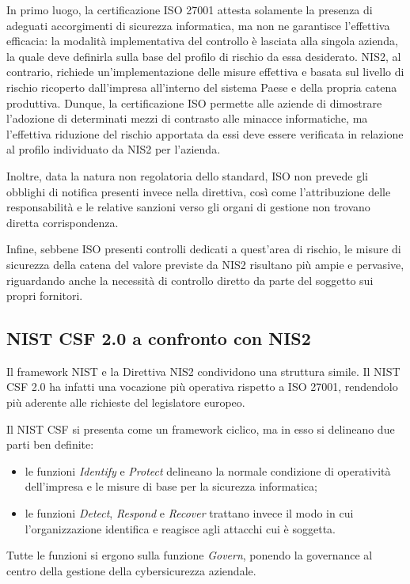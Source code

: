 In primo luogo, la certificazione ISO 27001 attesta solamente la presenza di adeguati accorgimenti di sicurezza informatica, ma non ne garantisce
l'effettiva efficacia: la modalità implementativa del controllo è lasciata alla singola azienda, la quale deve definirla sulla base del profilo di 
rischio da essa desiderato. NIS2, al contrario, richiede un'implementazione delle misure effettiva e basata sul livello di rischio ricoperto 
dall'impresa all'interno del sistema Paese e della propria catena produttiva. Dunque, la certificazione ISO permette alle aziende di dimostrare
l'adozione di determinati mezzi di contrasto alle minacce informatiche, ma l'effettiva riduzione del rischio apportata da essi deve essere 
verificata in relazione al profilo individuato da NIS2 per l'azienda.

Inoltre, data la natura non regolatoria dello standard, ISO non prevede gli obblighi di notifica presenti invece nella direttiva, così
come l'attribuzione delle responsabilità e le relative sanzioni verso gli organi di gestione non trovano diretta corrispondenza.

Infine, sebbene ISO presenti controlli dedicati a quest'area di rischio, le misure di sicurezza della catena del valore previste
da NIS2 risultano più ampie e pervasive, riguardando anche la necessità di controllo diretto da parte del soggetto sui propri fornitori.


\subsection{NIST CSF 2.0 a confronto con NIS2}
Il framework NIST e la Direttiva NIS2 condividono una struttura simile. Il NIST CSF 2.0 ha infatti una vocazione più operativa rispetto a 
ISO 27001, rendendolo più aderente alle richieste del legislatore europeo. 

Il NIST CSF si presenta come un framework ciclico, ma in esso si delineano due parti ben definite:
\begin{itemize}
    \item le funzioni \textit{Identify} e \textit{Protect} delineano la normale condizione di operatività dell'impresa e le misure di base
        per la sicurezza informatica;
    \item le funzioni \textit{Detect}, \textit{Respond} e \textit{Recover} trattano invece il modo in cui l'organizzazione identifica 
        e reagisce agli attacchi cui è soggetta.
\end{itemize}
Tutte le funzioni si ergono sulla funzione \textit{Govern}, ponendo la governance al centro della gestione della cybersicurezza aziendale.

